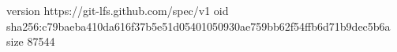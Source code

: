 version https://git-lfs.github.com/spec/v1
oid sha256:c79baeba410da616f37b5e51d05401050930ae759bb62f54ffb6d71b9dec5b6a
size 87544
